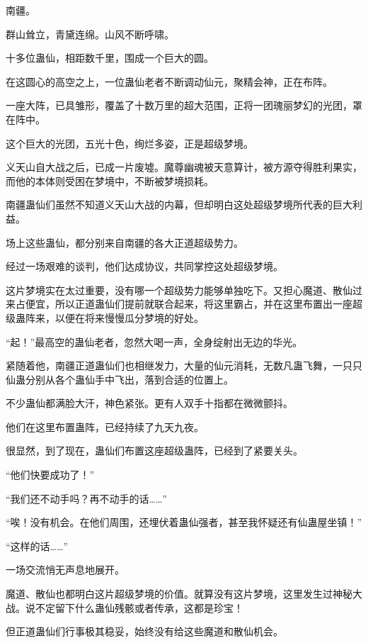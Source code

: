 
\begin{this_body}

南疆。

群山耸立，青黛连绵。山风不断呼啸。

十多位蛊仙，相距数千里，围成一个巨大的圆。

在这圆心的高空之上，一位蛊仙老者不断调动仙元，聚精会神，正在布阵。

一座大阵，已具雏形，覆盖了十数万里的超大范围，正将一团瑰丽梦幻的光团，罩在阵中。

这个巨大的光团，五光十色，绚烂多姿，正是超级梦境。

义天山自大战之后，已成一片废墟。魔尊幽魂被天意算计，被方源夺得胜利果实，而他的本体则受困在梦境中，不断被梦境损耗。

南疆蛊仙们虽然不知道义天山大战的内幕，但却明白这处超级梦境所代表的巨大利益。

场上这些蛊仙，都分别来自南疆的各大正道超级势力。

经过一场艰难的谈判，他们达成协议，共同掌控这处超级梦境。

这片梦境实在太过重要，没有哪一个超级势力能够单独吃下。又担心魔道、散仙过来占便宜，所以正道蛊仙们提前就联合起来，将这里霸占，并在这里布置出一座超级蛊阵来，以便在将来慢慢瓜分梦境的好处。

“起！”最高空的蛊仙老者，忽然大喝一声，全身绽射出无边的华光。

紧随着他，南疆正道蛊仙们也相继发力，大量的仙元消耗，无数凡蛊飞舞，一只只仙蛊分别从各个蛊仙手中飞出，落到合适的位置上。

不少蛊仙都满脸大汗，神色紧张。更有人双手十指都在微微颤抖。

他们在这里布置蛊阵，已经持续了九天九夜。

很显然，到了现在，蛊仙们布置这座超级蛊阵，已经到了紧要关头。

“他们快要成功了！”

“我们还不动手吗？再不动手的话……”

“唉！没有机会。在他们周围，还埋伏着蛊仙强者，甚至我怀疑还有仙蛊屋坐镇！”

“这样的话……”

一场交流悄无声息地展开。

魔道、散仙也都明白这片超级梦境的价值。就算没有这片梦境，这里发生过神秘大战。说不定留下什么蛊仙残骸或者传承，这都是珍宝！

但正道蛊仙们行事极其稳妥，始终没有给这些魔道和散仙机会。


\end{this_body}
